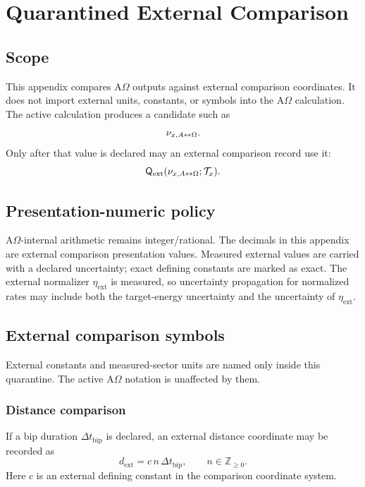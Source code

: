 \section{Quarantined External Comparison}\label{manual:external-comparison}

\subsection{Scope}\label{manual:external-comparison:scope}
This appendix compares A\(\Omega\) outputs against external comparison coordinates. It does not import external units, constants, or symbols into the A\(\Omega\) calculation. The active calculation produces a candidate such as
\[
\nu_{x,A{\leftrightarrow}\Omega}.
\]
Only after that value is declared may an external comparison record use it:
\[
\mathsf{Q}_{\mathrm{ext}}(\nu_{x,A{\leftrightarrow}\Omega};\mathcal T_x).
\]



\subsection{Presentation-numeric policy}\label{manual:external-comparison:presentation-numeric-policy}
A\(\Omega\)-internal arithmetic remains integer/rational. The decimals in this appendix are external comparison presentation values. Measured external values are carried with a declared uncertainty; exact defining constants are marked as exact. The external normalizer \(\eta_{\mathrm{ext}}\) is measured, so uncertainty propagation for normalized rates may include both the target-energy uncertainty and the uncertainty of \(\eta_{\mathrm{ext}}\).

\subsection{External comparison symbols}\label{manual:external-comparison-symbols}
External constants and measured-sector units are named only inside this quarantine. The active A\(\Omega\) notation is unaffected by them.

\subsubsection{Distance comparison}
If a bip duration \(\Delta t_{\mathrm{bip}}\) is declared, an external distance coordinate may be recorded as
\[
d_{\mathrm{ext}}=c\,n\,\Delta t_{\mathrm{bip}},
\qquad n\in\mathbb Z_{\ge0}.
\]
Here \(c\) is an external defining constant in the comparison coordinate system.

